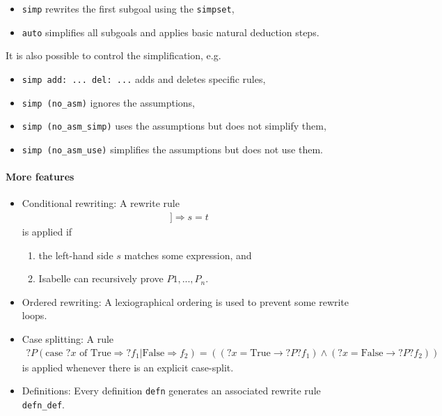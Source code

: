 \documentclass{article}
\begin{document}
\begin{itemize}
	\item \texttt{simp} rewrites the first subgoal using the \texttt{simpset},
	\item \texttt{auto} simplifies all subgoals and applies basic natural deduction steps.
\end{itemize}
It is also possible to control the simplification, e.g.
\begin{itemize}
	\item \texttt{simp add: ... del: ...} adds and deletes specific rules,
	\item \texttt{simp (no\_asm)} ignores the assumptions,
	\item \texttt{simp (no\_asm\_simp)} uses the assumptions but does not simplify them,
	\item \texttt{simp (no\_asm\_use)} simplifies the assumptions but does not use them.
\end{itemize}

\paragraph*{More features}

\begin{itemize}
	\item Conditional rewriting: A rewrite rule
	      \begin{align*}
		      [[P_1;...;P_n]]\Longrightarrow s = t
	      \end{align*}
	      is applied if
	      \begin{enumerate}
		      \item the left-hand side $s$ matches some expression, and
		      \item Isabelle can recursively prove $P1, ..., P_n$.
	      \end{enumerate}
	\item Ordered rewriting: A lexiographical ordering is used to prevent some rewrite loops.
	\item Case splitting: A rule \begin{align*}
		      ?P (\text{case $?x$ of True} \Rightarrow ?f_1 | \text{False} \Rightarrow f_2)
		      = ((?x = \text{True}\longrightarrow ?P?f_1)\wedge (?x = \text{False} \longrightarrow ?P?f_2))
	      \end{align*}
	      is applied whenever there is an explicit case-split.
	\item Definitions: Every definition \texttt{defn} generates an associated
	      rewrite rule \texttt{defn\_def}.
\end{itemize}
\end{document}
